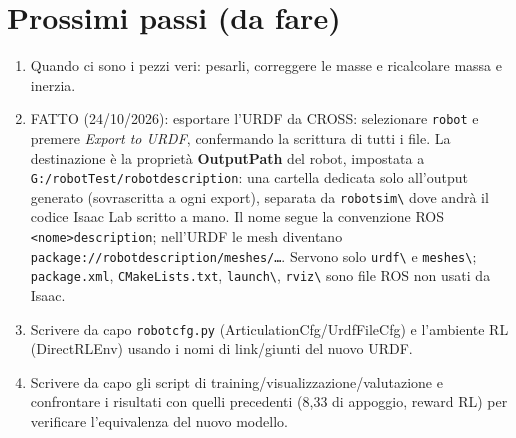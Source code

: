 \documentclass[11pt,a4paper]{article}
\renewcommand{\_}{\oldunderscore\allowbreak}
\begin{document}
\section{Prossimi passi (da fare)}
\begin{enumerate}[leftmargin=*]
  \item Quando ci sono i pezzi veri: pesarli, correggere le masse e ricalcolare massa e inerzia.
  \item FATTO (24/10/2026): esportare l'URDF da CROSS: selezionare \texttt{robot} e premere \emph{Export to URDF},
    confermando la scrittura di tutti i file. La destinazione \`e la propriet\`a \textbf{OutputPath} del
    robot, impostata a \texttt{G:/robotTest/robot\_description}: una cartella dedicata solo all'output
    generato (sovrascritta a ogni export), separata da \texttt{robot\_sim\textbackslash} dove andr\`a il
    codice Isaac Lab scritto a mano. Il nome segue la convenzione ROS \texttt{<nome>\_description}; nell'URDF
    le mesh diventano \texttt{package://robot\_description/meshes/\ldots}. Servono solo \texttt{urdf\textbackslash}
    e \texttt{meshes\textbackslash}; \texttt{package.xml}, \texttt{CMakeLists.txt}, \texttt{launch\textbackslash},
    \texttt{rviz\textbackslash} sono file ROS non usati da Isaac.
  \item Scrivere da capo \texttt{robot\_cfg.py} (ArticulationCfg/UrdfFileCfg) e l'ambiente RL
    (DirectRLEnv) usando i nomi di link/giunti del nuovo URDF.
  \item Scrivere da capo gli script di training/visualizzazione/valutazione e confrontare i risultati con
    quelli precedenti (8,33\textdegree{} di appoggio, reward RL) per verificare l'equivalenza del nuovo
    modello.
\end{enumerate}
\end{document}
